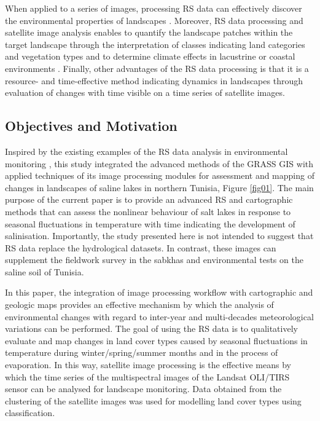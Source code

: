\documentclass[land,article,submit,pdftex,moreauthors]{Definitions/mdpi}
\begin{document}
When applied to a series of images, processing RS data can effectively discover the environmental properties of  landscapes \cite{Toujani,Quarmby,Gelebo}. Moreover, RS data processing and satellite image analysis enables to quantify the landscape patches within the target landscape through the interpretation of classes indicating land categories and vegetation types \cite{Benedetti,Godinho} and to determine climate effects in lacustrine or coastal environments \cite{Souissi}. Finally, other advantages of the RS data processing is that it is a resource- and time-effective method indicating dynamics in landscapes through evaluation of changes with time visible on a time series of satellite images. 

\subsection{Objectives and Motivation}

Inspired by the existing examples of the RS data analysis in environmental monitoring \cite{f9020059,Lemenkova202229,Fathalli,Abbas,Henchiri}, this study integrated the advanced methods of the GRASS GIS with applied techniques of its image processing modules for assessment and mapping of changes in landscapes of saline lakes in northern Tunisia, Figure \ref{fig01}. The main purpose of the current paper is to provide an advanced RS and cartographic methods that can assess the nonlinear behaviour of salt lakes in response to seasonal fluctuations in temperature with time indicating the development of salinisation. Importantly, the study presented here is not intended to suggest that RS data replace the hydrological datasets. In contrast, these images can supplement the fieldwork survey in the sabkhas and environmental tests on the saline soil of Tunisia. 

In this paper, the integration of image processing workflow with cartographic and geologic maps  provides an effective mechanism by which the analysis of environmental changes with regard to inter-year and multi-decades meteorological variations can be performed. The goal of using the RS data is to qualitatively evaluate and map changes in land cover types caused by seasonal fluctuations in temperature during winter/spring/summer months and in the process of evaporation. In this way, satellite image processing is the effective means by which the time series of the multispectral images of the Landsat OLI/TIRS sensor can be analysed for landscape monitoring. Data obtained from the clustering of the satellite images was used for modelling land cover types using classification. 
\end{document}
